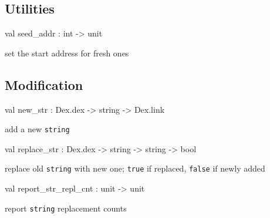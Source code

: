 \documentclass[11pt]{article}
\begin{document}
\ocamldocvspace{0.5cm}



\subsection{Utilities}




\label{val:Modify.seed-underscoreaddr}\begin{ocamldoccode}
val seed_addr : int -> unit
\end{ocamldoccode}
\begin{ocamldocdescription}
set the start address for fresh ones


\end{ocamldocdescription}




\subsection{Modification}




\label{val:Modify.new-underscorestr}\begin{ocamldoccode}
val new_str : Dex.dex -> string -> Dex.link
\end{ocamldoccode}
\begin{ocamldocdescription}
add a new {\tt{string}}


\end{ocamldocdescription}




\label{val:Modify.replace-underscorestr}\begin{ocamldoccode}
val replace_str : Dex.dex -> string -> string -> bool
\end{ocamldoccode}
\begin{ocamldocdescription}
replace old {\tt{string}} with new one;
 {\tt{true}} if replaced, {\tt{false}} if newly added


\end{ocamldocdescription}




\label{val:Modify.report-underscorestr-underscorerepl-underscorecnt}\begin{ocamldoccode}
val report_str_repl_cnt : unit -> unit
\end{ocamldoccode}
\begin{ocamldocdescription}
report {\tt{string}} replacement counts


\end{ocamldocdescription}
\end{document}
